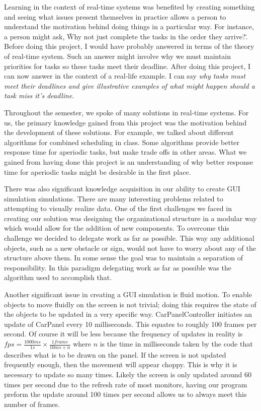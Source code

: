 \documentclass{article} %
\begin{document}
Learning in the context of real-time systems was benefited by
creating something and seeing what issues present themselves in practice allows a person to understand the motivation behind doing things in a particular way.
For instance, a person might ask, \"Why not just complete the tasks in the order they arrive?\". Before doing this project, I would have probably answered in terms of the theory of real-time system.
Such an answer might involve why we must maintain priorities for tasks so these tasks meet their deadline.
After doing this project, I can now answer in the context of a real-life example. I can say
\it why \normalfont
tasks must meet their deadlines and give illustrative examples of what might happen should a task miss it's deadline.

Throughout the semester, we spoke of many solutions in real-time systems.
For us, the primary knowledge gained from this project was the motivation behind the development of these solutions.
For example, we talked about different algorithms for combined scheduling in class. Some algorithms provide better response time for aperiodic tasks, but
make trade offs in other areas.
What we gained from having done this project is an understanding of why better response time for aperiodic tasks might be desirable in the first place. 

There was also significant knowledge acquisition in our ability to create GUI simulation simulations.
There are many interesting problems related to attempting to visually realize data.
One of the first challenges we faced in creating our solution was designing the organizational structure in a modular way which would allow for the addition of new components.
To overcome this challenge we decided to delegate work as far as possible.
This way any additional objects, such as a new obstacle or sign, would not have to worry about any of the structure above them.
In some sense the goal was to maintain a separation of responsibility. In this paradigm delegating work as far as possible was the algorithm used to accomplish that.

Another significant issue in creating a GUI simulation is fluid motion.
To enable objects to move fluidly on the screen is not trivial; doing this requires the state of the objects to be updated in a very specific way.
CarPanelController initiates an update of CarPanel every 10 milliseconds. This equates to roughly 100 frames per second. Of course it will be less because the frequency of updates in reality is $fps = \frac{1000 ms}{1 s} \times \frac{1 frame}{10ms + n}$ where $n$ is the time in milliseconds taken by the code that describes what is to be drawn on the panel.
If the screen is not updated frequently enough, then the movement will appear choppy.
This is why it is necessary to update so many times. Likely the screen is only updated around 60 times per second due to the refresh rate of most monitors, having our program preform the update around 100 times per second allows us to always meet this number of frames.
\end{document}
